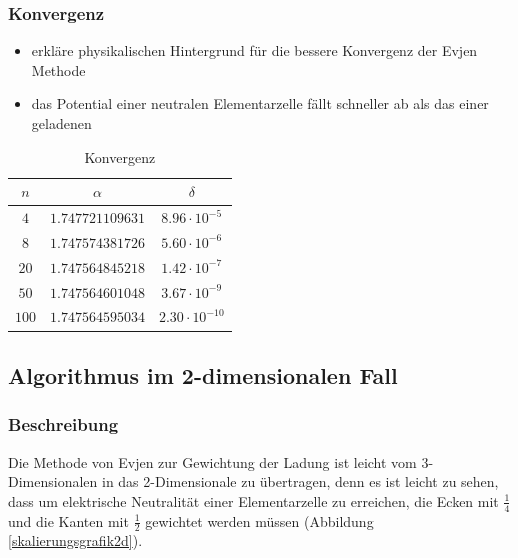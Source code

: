 \documentclass[10pt,a4paper]{article}
\begin{document}
\subsubsection{Konvergenz}

\begin{itemize}
\item erkläre physikalischen Hintergrund für die bessere Konvergenz der Evjen
Methode
\item das Potential einer neutralen Elementarzelle fällt schneller ab als das
einer geladenen
\end{itemize}

\begin{table}[h]
\centering
\begin{tabular}{c|c|c}
\rule[-1ex]{0pt}{2.5ex} $n$ & $\alpha$ & $\delta$ \\ 
\hline 
\rule[-1ex]{0pt}{2.5ex} $4$ & $1.747721109631$ & $8.96\cdot10^{-5}$ \\ 
\hline 
\rule[-1ex]{0pt}{2.5ex} $8$ & $1.747574381726$ & $5.60\cdot10^{-6}$ \\ 
\hline 
\rule[-1ex]{0pt}{2.5ex} $20$ & $1.747564845218$ & $1.42\cdot10^{-7}$ \\ 
\hline 
\rule[-1ex]{0pt}{2.5ex} $50$ & $1.747564601048$ & $3.67\cdot10^{-9}$ \\ 
\hline 
\rule[-1ex]{0pt}{2.5ex} $100$ & $1.747564595034$ & $2.30\cdot10^{-10}$ \\ 
\end{tabular} 
\caption{Konvergenz}
\end{table}

\subsection{Algorithmus im 2-dimensionalen Fall}
\subsubsection{Beschreibung}
Die Methode von Evjen zur Gewichtung der Ladung ist leicht vom 3-Dimensionalen
in das 2-Dimensionale zu übertragen, denn es ist leicht zu sehen, dass um elektrische
Neutralität einer Elementarzelle zu erreichen, die Ecken mit $\frac{1}{4}$ und die Kanten mit
$\frac{1}{2}$ gewichtet werden müssen (Abbildung \ref{skalierungsgrafik2d}).
\end{document}
